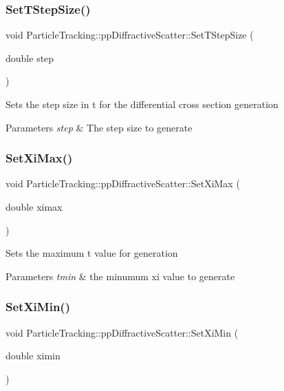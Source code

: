 \subsubsection{\texorpdfstring{Set\+T\+Step\+Size()}{SetTStepSize()}}
{\footnotesize\ttfamily void Particle\+Tracking\+::pp\+Diffractive\+Scatter\+::\+Set\+T\+Step\+Size (\begin{DoxyParamCaption}\item[{double}]{step }\end{DoxyParamCaption})}

Sets the step size in t for the differential cross section generation 
\begin{DoxyParams}{Parameters}
{\em step} & The step size to generate \\
\hline
\end{DoxyParams}
\mbox{\label{classParticleTracking_1_1ppDiffractiveScatter_acfd8385c3ee1f3e710a1c7ef15183039}} 
\subsubsection{\texorpdfstring{Set\+Xi\+Max()}{SetXiMax()}}
{\footnotesize\ttfamily void Particle\+Tracking\+::pp\+Diffractive\+Scatter\+::\+Set\+Xi\+Max (\begin{DoxyParamCaption}\item[{double}]{ximax }\end{DoxyParamCaption})}

Sets the maximum t value for generation 
\begin{DoxyParams}{Parameters}
{\em tmin} & the minumum xi value to generate \\
\hline
\end{DoxyParams}
\mbox{\label{classParticleTracking_1_1ppDiffractiveScatter_a8138fee1bfa1b108e2862a1f56024fa8}} 
\subsubsection{\texorpdfstring{Set\+Xi\+Min()}{SetXiMin()}}
{\footnotesize\ttfamily void Particle\+Tracking\+::pp\+Diffractive\+Scatter\+::\+Set\+Xi\+Min (\begin{DoxyParamCaption}\item[{double}]{ximin }\end{DoxyParamCaption})}

